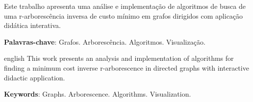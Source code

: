 \setlength{\absparsep}{18pt}
\begin{resumo}
	Este trabalho apresenta uma análise e implementação de algoritmos de busca de uma r-arborescência inversa de custo mínimo em grafos dirigidos com aplicação didática interativa.

	\textbf{Palavras-chave}: Grafos. Arborescência. Algoritmos. Visualização.
\end{resumo}

\begin{resumo}[Abstract]
	\begin{otherlanguage*}{english}
		This work presents an analysis and implementation of algorithms for finding a minimum cost inverse r-arborescence in directed graphs with interactive didactic application.

		\textbf{Keywords}: Graphs. Arborescence. Algorithms. Visualization.
	\end{otherlanguage*}
\end{resumo}
